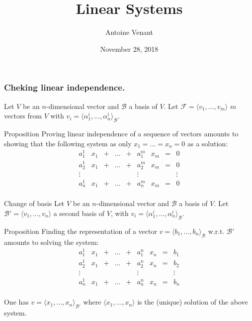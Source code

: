 \documentclass{beamer}
\begin{document}
\title{Linear Systems} 
\author{Antoine Venant}
\date{November 28, 2018}
\maketitle

\begin{frame}
  \frametitle{Cheking linear independence.}
  Let $V$ be an $n$-dimensional vector and $\mathcal{B}$ a basis of $V$. Let $\mathcal{F} = \langle v_1, \dots, v_m \rangle$ $m$ vectors from $V$ with $v_i = \langle \alpha^i_1, \dots, \alpha^i_n \rangle_{\mathcal{B}}$.
  \begin{block}{Proposition}
    Proving linear independence of a sequence of vectors amounts to showing that the following system as only $x_1 = \dots = x_n = 0$ as a solution:
    \[ \begin{array}{ccccccccc}
      a^1_1 & x_1 & + & \dots & + & a^m_1 & x_m & = & 0 \\
      a^1_2 & x_1 & + & \dots & + & a^m_2 & x_m & = & 0\\
      \vdots&     &   &      &  &\vdots&     &   & \vdots\\
      a^1_n & x_1 & + & \dots & + &  a^m_n & x_m & = & 0\\
    \end{array}
    \]
    
  \end{block}
\end{frame}

\begin{frame}{Change of basis}
  Let $V$ be an $n$-dimensional vector and $\mathcal{B}$ a basis of $V$. Let $\mathcal{B}' = \langle v_1, \dots, v_n \rangle$ a second basis of $V$, with $v_i = \langle \alpha^i_1, \dots, \alpha^i_n \rangle_{\mathcal{B}}$.

  \begin{block}{Proposition}
  Finding the representation of a vector $v = \langle b_1, \dots, b_n \rangle_{\mathcal{B}}$ w.r.t. $\mathcal{B}'$ amounts to solving the system:
  \[
  \begin{array}{ccccccccc}
    a^1_1 & x_1 & + & \dots & + & a^n_1 & x_n & = & b_1 \\
    a^1_2 & x_1 & + & \dots & + & a^n_2 & x_n & = & b_2\\
    \vdots&     &   &      &  &\vdots&     &   & \vdots\\
    a^1_n & x_1 & + & \dots & + &  a^n_n & x_n & = & b_n\\
  \end{array}
  \]

  One has $v = \langle x_1, \dots, x_n \rangle_{\mathcal{B}'}$ where $\langle x_1, \dots, x_n \rangle$ is the (unique) solution of the above system.
  \end{block}
  
\end{frame}
\end{document}
